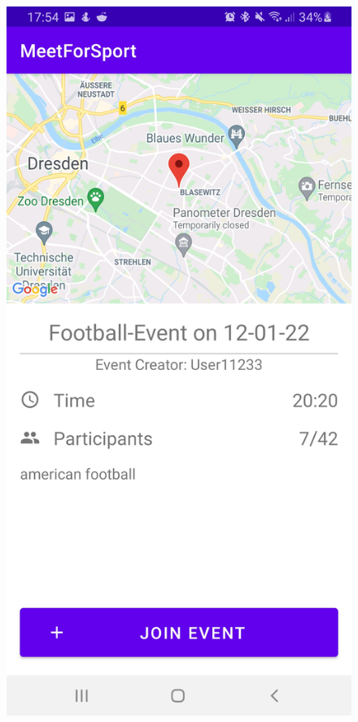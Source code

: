 \documentclass[aspectratio=169]{beamer}
\begin{document}
\begin{frame}
\begin{columns}
\begin{figure}
				\centering
				\includegraphics[width=1\textwidth]{media/Information.jpg}
			\end{figure}
		\end{columns}
	\end{frame}
\end{document}
